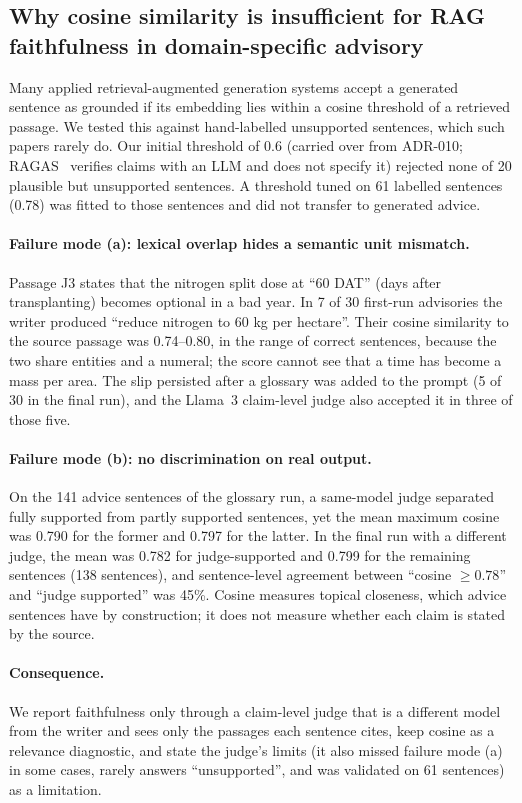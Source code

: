 \subsection{Why cosine similarity is insufficient for RAG faithfulness in domain-specific advisory}
\label{sec:cosine_insufficient}
Many applied retrieval-augmented generation systems accept a generated sentence as grounded if its embedding lies within a cosine threshold of a retrieved passage. We tested this against hand-labelled unsupported sentences, which such papers rarely do. Our initial threshold of 0.6 (carried over from ADR-010; RAGAS~\cite{es2023ragas} verifies claims with an LLM and does not specify it) rejected none of 20 plausible but unsupported sentences. A threshold tuned on 61 labelled sentences (0.78) was fitted to those sentences and did not transfer to generated advice.

\paragraph{Failure mode (a): lexical overlap hides a semantic unit mismatch.}
Passage J3 states that the nitrogen split dose at ``60 DAT'' (days after transplanting) becomes optional in a bad year. In 7 of 30 first-run advisories the writer produced ``reduce nitrogen to 60 kg per hectare''. Their cosine similarity to the source passage was 0.74--0.80, in the range of correct sentences, because the two share entities and a numeral; the score cannot see that a time has become a mass per area. The slip persisted after a glossary was added to the prompt (5 of 30 in the final run), and the Llama~3 claim-level judge also accepted it in three of those five.

\paragraph{Failure mode (b): no discrimination on real output.}
On the 141 advice sentences of the glossary run, a same-model judge separated fully supported from partly supported sentences, yet the mean maximum cosine was 0.790 for the former and 0.797 for the latter. In the final run with a different judge, the mean was 0.782 for judge-supported and 0.799 for the remaining sentences (138 sentences), and sentence-level agreement between ``cosine $\geq 0.78$'' and ``judge supported'' was 45\%. Cosine measures topical closeness, which advice sentences have by construction; it does not measure whether each claim is stated by the source.

\paragraph{Consequence.}
We report faithfulness only through a claim-level judge that is a different model from the writer and sees only the passages each sentence cites, keep cosine as a relevance diagnostic, and state the judge's limits (it also missed failure mode (a) in some cases, rarely answers ``unsupported'', and was validated on 61 sentences) as a limitation.

